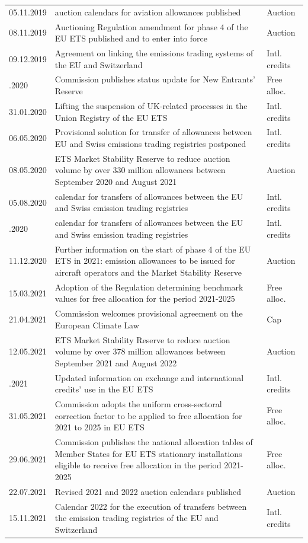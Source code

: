 \documentclass[
]{article}
\begin{document}
\begin{longtable}[l]{l>{\raggedright\arraybackslash}p{35em}l}
05.11.2019 & 2020 auction calendars for aviation allowances published & Auction\\
08.11.2019 & Auctioning Regulation amendment for phase 4 of the EU ETS published and to enter into force & Auction\\
09.12.2019 & Agreement on linking the emissions trading systems of the EU and Switzerland & Intl. credits\\
\addlinespace
15.01.2020 & Commission publishes status update for New Entrants’ Reserve & Free alloc.\\
31.01.2020 & Lifting the suspension of UK-related processes in the Union Registry of the EU ETS & Intl. credits\\
06.05.2020 & Provisional solution for transfer of allowances between EU and Swiss emissions trading registries postponed & Intl. credits\\
08.05.2020 & ETS Market Stability Reserve to reduce auction volume by over 330 million allowances between September 2020 and August 2021 & Auction\\
05.08.2020 & 2020 calendar for transfers of allowances between the EU and Swiss emission trading registries & Intl. credits\\
\addlinespace
27.11.2020 & 2021 calendar for transfers of allowances between the EU and Swiss emission trading registries & Intl. credits\\
11.12.2020 & Further information on the start of phase 4 of the EU ETS in 2021: emission allowances to be issued for aircraft operators and the Market Stability Reserve & Auction\\
15.03.2021 & Adoption of the Regulation determining benchmark values for free allocation for the period 2021-2025 & Free alloc.\\
21.04.2021 & Commission welcomes provisional agreement on the European Climate Law & Cap\\
12.05.2021 & ETS Market Stability Reserve to reduce auction volume by over 378 million allowances between September 2021 and August 2022 & Auction\\
\addlinespace
25.05.2021 & Updated information on exchange and international credits’ use in the EU ETS & Intl. credits\\
31.05.2021 & Commission adopts the uniform cross-sectoral correction factor to be applied to free allocation for 2021 to 2025 in EU ETS & Free alloc.\\
29.06.2021 & Commission publishes the national allocation tables of Member States for EU ETS stationary installations eligible to receive free allocation in the period 2021-2025 & Free alloc.\\
22.07.2021 & Revised 2021 and 2022 auction calendars published & Auction\\
15.11.2021 & Calendar 2022 for the execution of transfers between the emission trading registries of the EU and Switzerland & Intl. credits\\*
\end{longtable}
\endgroup{}

\endgroup
\newpage
\end{document}
